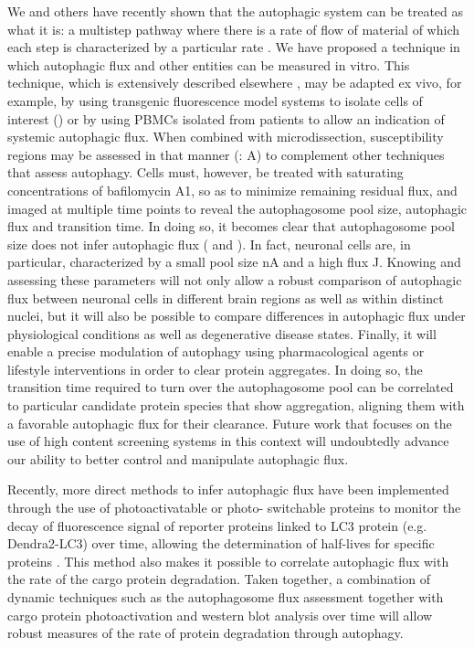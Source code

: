 We and others have recently shown that the autophagic system can be treated as what it is: a multistep pathway where there is a rate of flow of material of which each step is characterized by a particular rate \citep{Meijer2009,loos2014}. We have proposed a technique in which autophagic flux and other entities can be measured in vitro. This technique, which is extensively described elsewhere \citep{loos2014}, may be adapted ex vivo, for example, by using transgenic fluorescence model systems \citep{Mizushima2004a} to isolate cells of interest () or by using PBMCs isolated from patients \citep{Rangwala2014} to allow an indication of systemic autophagic flux. When combined with microdissection, susceptibility regions may be assessed in that manner (: A) to complement other techniques that assess autophagy. Cells must, however, be treated with saturating concentrations of bafilomycin A1, so as to minimize remaining residual flux, and imaged at multiple time points to reveal the autophagosome pool size, autophagic flux and transition time. In doing so, it becomes clear that autophagosome pool size does not infer autophagic flux ( and ). In fact, neuronal cells are, in particular, characterized by a small pool size nA and a high flux J. Knowing and assessing these parameters will not only allow a robust comparison of autophagic flux between neuronal cells in different brain regions as well as within distinct nuclei, but it will also be possible to compare differences in autophagic flux under physiological conditions as well as degenerative disease states. Finally, it will enable a precise modulation of autophagy using pharmacological agents or lifestyle interventions in order to clear protein aggregates. In doing so, the transition time required to turn over the autophagosome pool can be correlated to particular candidate protein species that show aggregation, aligning them with a favorable autophagic flux for their clearance. Future work that focuses on the use of high content screening systems in this context will undoubtedly advance our ability to better control and manipulate autophagic flux. 

Recently, more direct methods to infer autophagic flux have been implemented through the use of photoactivatable or photo- switchable proteins to monitor the decay of fluorescence signal of reporter proteins linked to LC3 protein (e.g. Dendra2-LC3) over time, allowing the determination of half-lives for specific proteins
\citep{Tsvetkov2013}. This method also makes it possible to correlate autophagic flux with the rate of the cargo protein degradation. Taken together, a combination of dynamic techniques such as the autophagosome flux assessment together with cargo protein photoactivation and western blot analysis over time will allow robust measures of the rate of protein degradation through autophagy.

